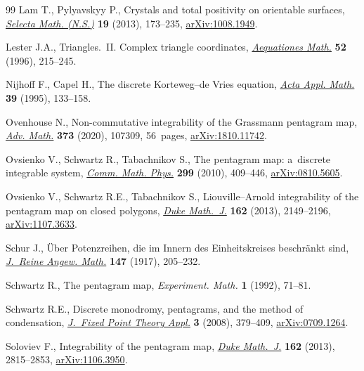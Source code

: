 \begin{thebibliography}{99}
Lam T., Pylyavskyy P., Crystals and total positivity on orientable surfaces,
 \href{https://doi.org/10.1007/s00029-012-0094-2}{\textit{Selecta Math.
 (N.S.)}} \textbf{19} (2013), 173--235,
 \href{http://arxiv.org/abs/1008.1949}{arXiv:1008.1949}.

Lester J.A., Triangles.~{II}. {C}omplex triangle coordinates,
 \href{https://doi.org/10.1007/BF01818341}{\textit{Aequationes Math.}}
 \textbf{52} (1996), 215--245.

Nijhoff F., Capel H., The discrete {K}orteweg--de {V}ries equation,
 \href{https://doi.org/10.1007/BF00994631}{\textit{Acta Appl. Math.}}
 \textbf{39} (1995), 133--158.

Ovenhouse N., Non-commutative integrability of the {G}rassmann pentagram map,
 \href{https://doi.org/10.1016/j.aim.2020.107309}{\textit{Adv. Math.}}
 \textbf{373} (2020), 107309, 56~pages,
 \href{http://arxiv.org/abs/1810.11742}{arXiv:1810.11742}.

Ovsienko V., Schwartz R., Tabachnikov S., The pentagram map: a~discrete
 integrable system,
 \href{https://doi.org/10.1007/s00220-010-1075-y}{\textit{Comm. Math. Phys.}}
 \textbf{299} (2010), 409--446,
 \href{http://arxiv.org/abs/0810.5605}{arXiv:0810.5605}.

Ovsienko V., Schwartz R.E., Tabachnikov S., Liouville--{A}rnold integrability
 of the pentagram map on closed polygons,
 \href{https://doi.org/10.1215/00127094-2348219}{\textit{Duke Math.~J.}}
 \textbf{162} (2013), 2149--2196,
 \href{http://arxiv.org/abs/1107.3633}{arXiv:1107.3633}.

Schur J., \"Uber {P}otenzreihen, die im {I}nnern des {E}inheitskreises
 beschr\"ankt sind,
 \href{https://doi.org/10.1515/crll.1917.147.205}{\textit{J.~Reine Angew.
 Math.}} \textbf{147} (1917), 205--232.

Schwartz R., The pentagram map, \textit{Experiment. Math.} \textbf{1} (1992),
 71--81.

Schwartz R.E., Discrete monodromy, pentagrams, and the method of condensation,
 \href{https://doi.org/10.1007/s11784-008-0079-0}{\textit{J.~Fixed Point
 Theory Appl.}} \textbf{3} (2008), 379--409,
 \href{http://arxiv.org/abs/0709.1264}{arXiv:0709.1264}.

Soloviev F., Integrability of the pentagram map,
 \href{https://doi.org/10.1215/00127094-2382228}{\textit{Duke Math.~J.}}
 \textbf{162} (2013), 2815--2853,
 \href{http://arxiv.org/abs/1106.3950}{arXiv:1106.3950}.


\end{thebibliography}
